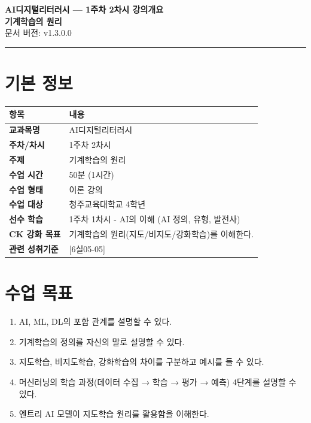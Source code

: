 \documentclass[11pt,a4paper]{article}
\begin{document}
\begin{center}
{\LARGE\bfseries\color{mainblue} AI디지털리터러시 — 1주차 2차시 강의개요}\\[0.5em]
{\Large\bfseries 기계학습의 원리}\\[0.5em]
{\normalsize 문서 버전: v1.3.0.0}
\end{center}

\vspace{1em}
\hrule
\vspace{1em}

\section{기본 정보}

\begin{center}
\begin{tabular}{C{3cm}L{10cm}}
\toprule
\textbf{항목} & \textbf{내용} \\
\midrule
\textbf{교과목명} & AI디지털리터러시 \\
\textbf{주차/차시} & 1주차 2차시 \\
\textbf{주제} & 기계학습의 원리 \\
\textbf{수업 시간} & 50분 (1시간) \\
\textbf{수업 형태} & 이론 강의 \\
\textbf{수업 대상} & 청주교육대학교 4학년 \\
\textbf{선수 학습} & 1주차 1차시 - AI의 이해 (AI 정의, 유형, 발전사) \\
\textbf{CK 강화 목표} & 기계학습의 원리(지도/비지도/강화학습)를 이해한다. \\
\textbf{관련 성취기준} & {[6실05-05]} \\
\bottomrule
\end{tabular}
\end{center}

\section{수업 목표}

\begin{enumerate}[leftmargin=2em]
\item AI, ML, DL의 포함 관계를 설명할 수 있다.
\item 기계학습의 정의를 자신의 말로 설명할 수 있다.
\item 지도학습, 비지도학습, 강화학습의 차이를 구분하고 예시를 들 수 있다.
\item 머신러닝의 학습 과정(데이터 수집 → 학습 → 평가 → 예측) 4단계를 설명할 수 있다.
\item 엔트리 AI 모델이 지도학습 원리를 활용함을 이해한다.
\end{enumerate}
\end{document}
